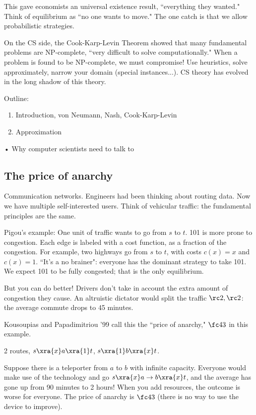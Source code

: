 This gave economists an universal existence result, ``everything they wanted." %
Think of equilibrium as ``no one wants to move." The one catch is that we allow probabilistic strategies.

On the CS side, the Cook-Karp-Levin Theorem showed that many fundamental problems are NP-complete, ``very difficult to solve computationally." When a problem is found to be NP-complete, we must compromise! Use heuristics, solve approximately, narrow your domain (special instances...). CS theory has evolved in the long shadow of this theory.

Outline:
\begin{enumerate}
\item
Introduction, von Neumann, Nash, Cook-Karp-Levin
\item
Approximation
\end{enumerate}•
Why computer scientists need to talk to 

\subsection{The price of anarchy}

Communication networks. Engineers had been thinking about routing data. Now we have multiple self-interested users.
Think of vehicular traffic: the fundamental principles are the same.

Pigou's example: One unit of traffic wants to go from $s$ to $t$. 101 is more prone to congestion. Each edge is labeled with a cost function, as a fraction of the congestion. For example, two highways go from $s$ to $t$, with costs $c(x)=x$ and $c(x)=1$. ``It's a no brainer": everyone has the dominant strategy to take 101. We expect 101 to be fully congested; that is the only equilibrium.

But you can do better! Drivers don't take in account the extra amount of congestion they cause. An altruistic dictator would split the traffic $\rc2,\rc2$: the average commute drops to 45 minutes.

Kousoupias and Papadimitriou '99 call this the ``price of anarchy," $\fc 43$ in this example.

\begin{ex}
2 routes, $s\xra{x} a \xra{1} t$, $s\xra{1} b \xra{x} t$.

Suppose there is a teleporter from $a$ to $b$ with infinite capacity. Everyone would make use of the technology and go $s\xra{x}a\to b\xra{x}t$, and the average has gone up from 90 minutes to 2 hours! When you add resources, the outcome is worse for everyone. The price of anarchy is $\fc 43$ (there is no way to use the device to improve).
\end{ex}

